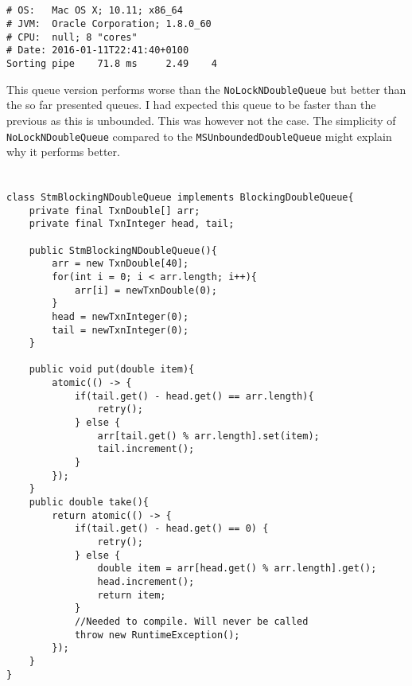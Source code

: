 \documentclass{ituhandin}
\begin{document}
\section{}
\begin{lstlisting}[language={},frame={}]
# OS:   Mac OS X; 10.11; x86_64
# JVM:  Oracle Corporation; 1.8.0_60
# CPU:  null; 8 "cores"
# Date: 2016-01-11T22:41:40+0100
Sorting pipe    71.8 ms     2.49    4
\end{lstlisting}

This queue version performs worse than the \texttt{NoLockNDoubleQueue} but better than the so far presented queues. I had expected this queue to be faster than the previous as this is unbounded. This was however not the case. The simplicity of \texttt{NoLockNDoubleQueue} compared to the \texttt{MSUnboundedDoubleQueue} might explain why it performs better.

\chapter{} %
\section{}
\begin{lstlisting}[caption=Implementation of the \texttt{MSUnboundedDoubleQueue}]
class StmBlockingNDoubleQueue implements BlockingDoubleQueue{
    private final TxnDouble[] arr;
    private final TxnInteger head, tail;

    public StmBlockingNDoubleQueue(){
        arr = new TxnDouble[40];
        for(int i = 0; i < arr.length; i++){
            arr[i] = newTxnDouble(0);
        }
        head = newTxnInteger(0);
        tail = newTxnInteger(0);
    } 

    public void put(double item){
        atomic(() -> {
            if(tail.get() - head.get() == arr.length){
                retry();
            } else {
                arr[tail.get() % arr.length].set(item);
                tail.increment(); 
            } 
        });
    }
    public double take(){ 
        return atomic(() -> {
            if(tail.get() - head.get() == 0) {
                retry();
            } else {
                double item = arr[head.get() % arr.length].get();
                head.increment();
                return item;
            }
            //Needed to compile. Will never be called
            throw new RuntimeException(); 
        });
    }
}
\end{lstlisting}
\end{document}
